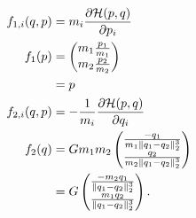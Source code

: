 \begin{align*}
 f_{1,i}(q,p) &= m_i \fpart{\Ha(p,q)}{p_i} \\	
  f_1(p) & =
  \begin{pmatrix}
    m_1\frac{p_1}{m_1}\\
    m_2\frac{p_2}{m_2}
  \end{pmatrix}\\
  & = p\\
%	
 f_{2,i}(q,p) &= -\frac{1}{m_i}\fpart{\Ha(p,q)}{q_i} \\
  f_2(q) & = Gm_1m_2
  \begin{pmatrix}
    \frac{-q_1}{m_1\|q_1-q_2\|_2^3}\\
    \frac{q_2}{m_2\|q_1-q_2\|_2^3}
  \end{pmatrix}\\
  & = G
  \begin{pmatrix}
    \frac{-m_2q_1}{\|q_1-q_2\|_2^3}\\
    \frac{m_1q_2}{\|q_1-q_2\|_2^3}
  \end{pmatrix}.
\end{align*}

